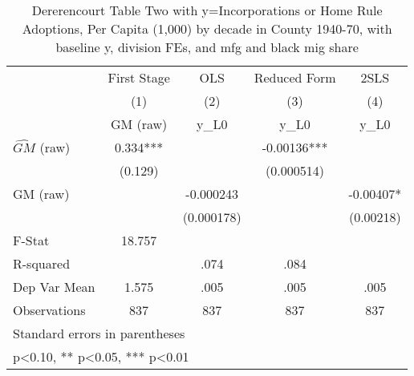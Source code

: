 \begin{table}[htbp]\centering
\def\sym#1{\ifmmode^{#1}\else\(^{#1}\)\fi}
\caption{Dererencourt Table Two with y=Incorporations or Home Rule Adoptions, Per Capita (1,000) by decade in County 1940-70, with baseline y, division FEs, and mfg and black mig share}
\begin{tabular}{l*{4}{c}}
\toprule
                    & First Stage   &         OLS   &Reduced Form   &        2SLS   \\
                    &\multicolumn{1}{c}{(1)}&\multicolumn{1}{c}{(2)}&\multicolumn{1}{c}{(3)}&\multicolumn{1}{c}{(4)}\\
                    &\multicolumn{1}{c}{GM  (raw)}&\multicolumn{1}{c}{y\_L0}&\multicolumn{1}{c}{y\_L0}&\multicolumn{1}{c}{y\_L0}\\
\midrule
$\hat{GM}$ (raw)    &       0.334***&               &    -0.00136***&               \\
                    &     (0.129)   &               &  (0.000514)   &               \\
\addlinespace
GM  (raw)           &               &   -0.000243   &               &    -0.00407*  \\
                    &               &  (0.000178)   &               &   (0.00218)   \\
\midrule
F-Stat              &      18.757   &               &               &               \\
R-squared           &               &        .074   &        .084   &               \\
Dep Var Mean        &       1.575   &        .005   &        .005   &        .005   \\
Observations        &         837   &         837   &         837   &         837   \\
\bottomrule
\multicolumn{5}{l}{\footnotesize Standard errors in parentheses}\\
\multicolumn{5}{l}{\footnotesize * p<0.10, ** p<0.05, *** p<0.01}\\
\end{tabular}
\end{table}
